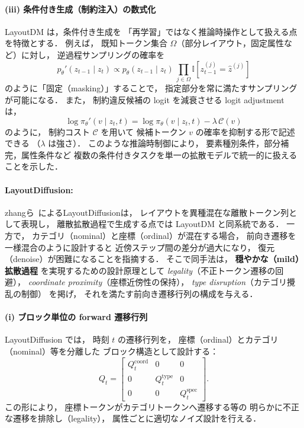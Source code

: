 \documentclass[a4j,12pt,dvipdfmx]{jsreport}
\begin{document}
\paragraph{(iii) 条件付き生成（制約注入）の数式化}
LayoutDM は，条件付き生成を
「再学習」ではなく推論時操作として扱える点を特徴とする．
例えば，
既知トークン集合 $\Omega$（部分レイアウト，固定属性など）に対し，
逆過程サンプリングの確率を
\begin{equation}
   p_\theta'(z_{t-1}\mid z_t)
   \propto
   p_\theta(z_{t-1}\mid z_t)\,
   \prod_{j\in\Omega}\mathbb{I}[z_{t-1}^{(j)}=\hat{z}^{(j)}]
\end{equation}
のように「固定（masking）」することで，
指定部分を常に満たすサンプリングが可能になる．
また，
制約違反候補の logit を減衰させる
logit adjustment は，
\begin{equation}
   \log \pi_\theta'(v\mid z_t,t)
   =
   \log \pi_\theta(v\mid z_t,t)
   -
   \lambda\,\mathcal{C}(v)
\end{equation}
のように，
制約コスト $\mathcal{C}$ を用いて
候補トークン $v$ の確率を抑制する形で記述できる
（$\lambda$ は強さ）．
このような推論時制御により，
要素種別条件，部分補完，属性条件など
複数の条件付きタスクを単一の拡散モデルで統一的に扱えることを示した．


\paragraph{LayoutDiffusion:}
zhangら~\cite{zhang_layoutdiffusion_2023}によるLayoutDiffusionは，
レイアウトを異種混在な離散トークン列として表現し，
離散拡散過程で生成する点では LayoutDM と同系統である．
一方で，
カテゴリ（nominal）と座標（ordinal）が混在する場合，
前向き遷移を一様混合のように設計すると
近傍ステップ間の差分が過大になり，
復元（denoise）が困難になることを指摘する．
そこで同手法は，
\textbf{穏やかな（mild）拡散過程} を実現するための設計原理として
\textit{legality}（不正トークン遷移の回避），
\textit{coordinate proximity}（座標近傍性の保持），
\textit{type disruption}（カテゴリ攪乱の制御）
を掲げ，
それを満たす前向き遷移行列の構成を与える．

\paragraph{(i) ブロック単位の forward 遷移行列}
LayoutDiffusion では，
時刻 $t$ の遷移行列を，
座標（ordinal）とカテゴリ（nominal）等を分離した
ブロック構造として設計する：
\begin{equation}
   Q_t
   =
   \begin{bmatrix}
      Q_t^{\mathrm{coord}} & 0                   & 0                   \\
      0                    & Q_t^{\mathrm{type}} & 0                   \\
      0                    & 0                   & Q_t^{\mathrm{spec}}
   \end{bmatrix}.
   \label{eq:layoutdiffusion_block_Q}
\end{equation}
この形により，
座標トークンがカテゴリトークンへ遷移する等の
明らかに不正な遷移を排除し（legality），
属性ごとに適切なノイズ設計を行える．
\end{document}
